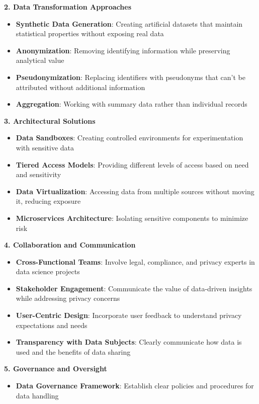 \documentclass[12pt]{article}
\begin{document}
\begin{enumerate}
\begin{tcolorbox}[colback=blue!5!white,colframe=blue!75!black,title={Solution}]
    \textbf{2. Data Transformation Approaches}
    \begin{itemize}
        \item \textbf{Synthetic Data Generation}: Creating artificial datasets that maintain statistical properties without exposing real data
        \item \textbf{Anonymization}: Removing identifying information while preserving analytical value
        \item \textbf{Pseudonymization}: Replacing identifiers with pseudonyms that can't be attributed without additional information
        \item \textbf{Aggregation}: Working with summary data rather than individual records
    \end{itemize}
    
    \textbf{3. Architectural Solutions}
    \begin{itemize}
        \item \textbf{Data Sandboxes}: Creating controlled environments for experimentation with sensitive data
        \item \textbf{Tiered Access Models}: Providing different levels of access based on need and sensitivity
        \item \textbf{Data Virtualization}: Accessing data from multiple sources without moving it, reducing exposure
        \item \textbf{Microservices Architecture}: Isolating sensitive components to minimize risk
    \end{itemize}
    \textbf{4. Collaboration and Communication}
    \begin{itemize}
        \item \textbf{Cross-Functional Teams}: Involve legal, compliance, and privacy experts in data science projects
        \item \textbf{Stakeholder Engagement}: Communicate the value of data-driven insights while addressing privacy concerns
        \item \textbf{User-Centric Design}: Incorporate user feedback to understand privacy expectations and needs
        \item \textbf{Transparency with Data Subjects}: Clearly communicate how data is used and the benefits of data sharing
    \end{itemize}
    \textbf{5. Governance and Oversight}
    \begin{itemize}
        \item \textbf{Data Governance Framework}: Establish clear policies and procedures for data handling

\end{itemize}
\end{tcolorbox}
\end{enumerate}
\end{document}

